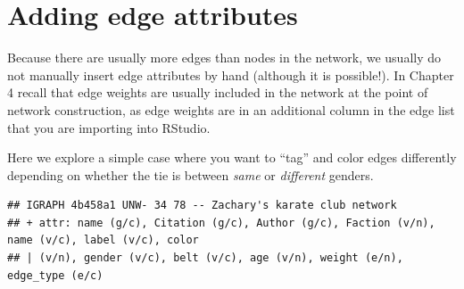\documentclass[
]{book}
\newenvironment{Shaded}{\begin{snugshade}}{\end{snugshade}}
\newcommand{\CommentTok}[1]{\textcolor[rgb]{0.56,0.35,0.01}{\textit{#1}}}
\newcommand{\FunctionTok}[1]{\textcolor[rgb]{0.13,0.29,0.53}{\textbf{#1}}}
\newcommand{\NormalTok}[1]{#1}
\newcommand{\OtherTok}[1]{\textcolor[rgb]{0.56,0.35,0.01}{#1}}
\newcommand{\SpecialCharTok}[1]{\textcolor[rgb]{0.81,0.36,0.00}{\textbf{#1}}}
\newcommand{\StringTok}[1]{\textcolor[rgb]{0.31,0.60,0.02}{#1}}
\begin{document}
\section{Adding edge attributes}\label{adding-edge-attributes}

Because there are usually more edges than nodes in the network, we usually do not manually insert edge attributes by hand (although it is possible!). In Chapter 4 recall that edge weights are usually included in the network at the point of network construction, as edge weights are in an additional column in the edge list that you are importing into RStudio.

Here we explore a simple case where you want to ``tag'' and color edges differently depending on whether the tie is between \emph{same} or \emph{different} genders.

\begin{Shaded}
\end{Shaded}

\begin{verbatim}
## IGRAPH 4b458a1 UNW- 34 78 -- Zachary's karate club network
## + attr: name (g/c), Citation (g/c), Author (g/c), Faction (v/n), name (v/c), label (v/c), color
## | (v/n), gender (v/c), belt (v/c), age (v/n), weight (e/n), edge_type (e/c)
\end{verbatim}
\end{document}
